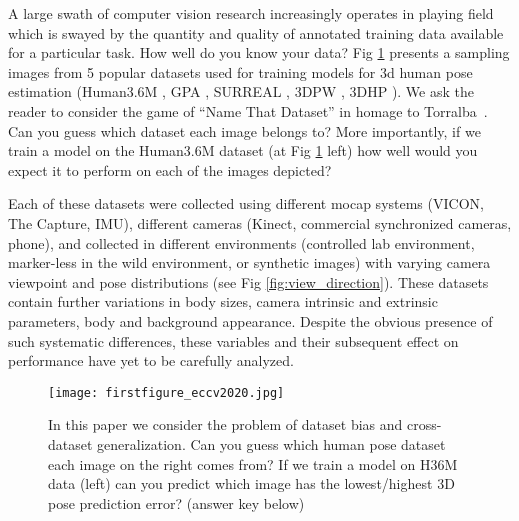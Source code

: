 \documentclass[runningheads]{llncs}
\begin{document}
A large swath of computer vision research increasingly operates in playing
field which is swayed by the quantity and quality of annotated training data
available for a particular task. How well do you know your data?  Fig
\ref{fig:vis1sample} presents a sampling images from 5 popular datasets used
for training models for 3d human pose estimation (Human3.6M \cite{h36m_pami},
GPA \cite{gpa}, SURREAL \cite{varol17_surreal}, 3DPW \cite{inthewildeccv2018} ,
3DHP \cite{mono_3dhp2017}). We ask the reader to consider the game of ``Name
That Dataset'' in homage to Torralba~.  Can you
guess which dataset each image belongs to? More importantly, if we train a
model on the Human3.6M dataset (at Fig \ref{fig:vis1sample} left) how well
would you expect it to perform on each of the images depicted?
 
Each of these datasets were collected using different mocap systems (VICON, The
Capture, IMU), different cameras (Kinect, commercial synchronized cameras,
phone), and collected in different environments (controlled lab environment,
marker-less in the wild environment, or synthetic images) with varying
camera viewpoint and pose distributions (see Fig \ref{fig:view_direction}).
These datasets contain further variations in body sizes, camera intrinsic and
extrinsic parameters, body and background appearance.  Despite the obvious
presence of such systematic differences, these variables and their subsequent
effect on performance have yet to be carefully analyzed. 

  \begin{figure}[t]
\begin{center}
   \texttt{[image: firstfigure\_eccv2020.jpg]}
\end{center}
   \caption[]{
   In this paper we consider the problem of dataset bias and cross-dataset generalization. Can you guess which human pose dataset each image on the
   right comes from? If we train a model on H36M data (left) can you predict which
   image has the lowest/highest 3D pose prediction error? (answer key below)\protect\footnotemark}
   
\label{fig:vis1sample}
\vspace{-0.15in}
\end{figure}
\end{document}
